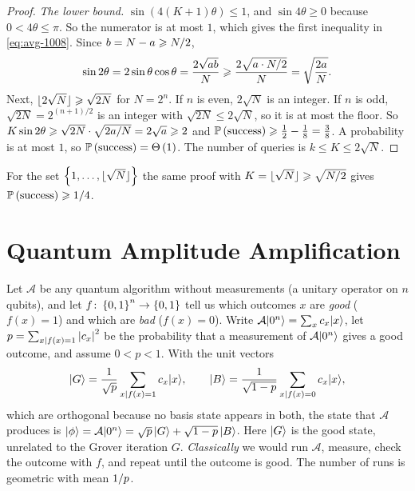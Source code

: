 \begin{exercisebox}
\begin{proof}
    \emph{The lower bound.} $\sin(4(K+1)\theta) \leq 1$, and $\sin 4\theta \geq 0$ because
    $0 < 4\theta \leq \pi$. So the numerator is at most $1$, which gives the first inequality in
    \cref{eq:avg-1008}. Since $b = N - a \geqslant N/2$,
    \[\sin 2\theta = 2\sin\theta\cos\theta = \frac{2\sqrt{ab}}{N} \geqslant \frac{2\sqrt{a \cdot N/2}}{N} = \sqrt{\frac{2a}{N}}.\]
    Next, $\floor{2\sqrt{N}} \geq \sqrt{2N}$ for $N = 2^n$. If $n$ is even, $2\sqrt{N}$ is an integer.
    If $n$ is odd, $\sqrt{2N} = 2^{(n+1)/2}$ is an integer with $\sqrt{2N} \leq 2\sqrt{N}$, so it is at
    most the floor. So $K\sin 2\theta \geqslant \sqrt{2N} \cdot \sqrt{2a/N} = 2\sqrt{a} \geqslant 2$
    and $\prob{\text{success}} \geq \frac{1}{2} - \frac{1}{8} = \frac{3}{8}$. A probability is at most
    $1$, so $\prob{\text{success}} = \bigTh{1}$. The number of queries is $k \leq K \leq 2\sqrt{N}$.
\end{proof}
\end{exercisebox}

For the set $\set{1, \dots, \floor{\sqrt{N}}}$ the same proof with
$K = \floor{\sqrt{N}} \geq \sqrt{\sfrac{N}{2}}$ gives $\prob{\text{success}} \geq \sfrac{1}{4}$.

\section{Quantum Amplitude Amplification}\label{sec:ampamp-1008}

Let $\mathcal{A}$ be any quantum algorithm without measurements (a unitary operator on $n$
qubits), and let $f \colon \left\lbrace0,1\right\rbrace^n \to \left\lbrace0,1\right\rbrace$ tell us which outcomes $x$ are \emph{good}
($f(x) = 1$) and which are \emph{bad} ($f(x) = 0$). Write
$\mathcal{A}\lvert 0^n \rangle = \sum_x c_x \lvert x \rangle$, let
$p = \sum_{x \mid f(x) = 1} \left\lvert c_x\right\rvert^2$ be the probability that a measurement of
$\mathcal{A}\lvert 0^n \rangle$ gives a good outcome, and assume $0 < p < 1$. With the unit vectors
\[\lvert G \rangle = \frac{1}{\sqrt{p}} \sum_{x \mid f(x) = 1} c_x \lvert x \rangle,
    \qquad
    \lvert B \rangle = \frac{1}{\sqrt{1-p}} \sum_{x \mid f(x) = 0} c_x \lvert x \rangle,\]
which are orthogonal because no basis state appears in both, the state that $\mathcal{A}$ produces is
$\lvert \phi \rangle = \mathcal{A}\lvert 0^n \rangle = \sqrt{p}\, \lvert G \rangle + \sqrt{1-p}\, \lvert B \rangle$. Here $\lvert G \rangle$ is
the good state, unrelated to the Grover iteration $G$.
\emph{Classically} we would run $\mathcal{A}$, measure, check the outcome with $f$, and repeat until
the outcome is good. The number of runs is geometric with mean $1/p$.


